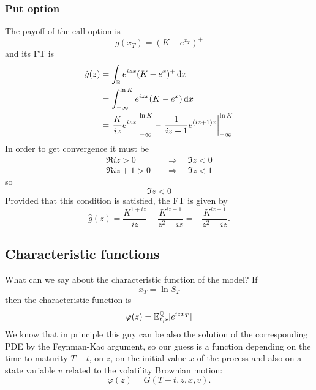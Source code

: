 \subsubsection{Put option}
The payoff of the call option is
\begin{equation}
    g(x_T) = (K-e^{x_T})^+
\end{equation}
and its FT is
\begin{align}
    \notag\hat{g}(z) &= \int_{\mathbb{R}} e^{izx} (K-e^x)^+\,\dd x \\
    &=
    \notag \int_{-\infty}^{\ln K} e^{izx}(K-e^{x})\,\dd x \\
    &=
    \eval{\frac{K}{iz}e^{izx}}^{\ln K}_{-\infty} - \eval{\frac{1}{iz+1}e^{(iz+1)x}}_{-\infty}^{\ln K}
\end{align}
In order to get convergence it must be
\begin{align*}
    \Re{iz} > 0 &\quad\Rightarrow\quad \Im{z} < 0 \\
    \Re{iz+1} > 0 &\quad\Rightarrow\quad \Im{z} < 1
\end{align*}
so
\begin{equation}
    \Im{z} < 0
\end{equation}
Provided that this condition is satisfied, the FT is given by
\begin{equation}
    \hat{g}(z) = \frac{K^{1+iz}}{iz} - \frac{K^{iz+1}}{z^2-iz} = -\frac{K^{iz+1}}{z^2-iz}.
\end{equation}

\subsection{Characteristic functions}
What can we say about the characteristic function of the model? If
\begin{equation*}
    x_T = \ln S_T
\end{equation*}
then the characteristic function is
\begin{equation*}
    \varphi(z) = \mathbb{E}^{\mathbb{Q}}_{t,x}[e^{izx_T}]
\end{equation*}
We know that in principle this guy can be also the solution of the corresponding PDE by the Feynman-Kac argument, so our guess is a function depending on the time to maturity $T-t$, on $z$, on the initial value $x$ of the process and also on a state variable $v$ related to the volatility Brownian motion:
\begin{equation*}
    \varphi(z) = G(T-t,z,x,v).
\end{equation*}

